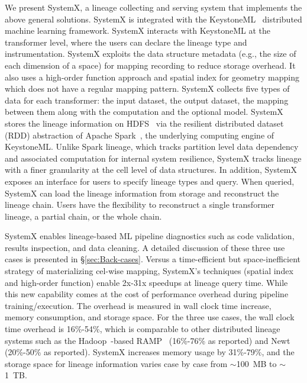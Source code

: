 \documentclass{sig-alternate}
\begin{document}
We present SystemX, a lineage collecting and serving system that implements the above general solutions.
SystemX is integrated with the KeystoneML~\cite{sparks15} distributed machine learning framework.
SystemX interacts with KeystoneML at the transformer level, where the users can declare the lineage type and instrumentation.
SystemX exploits the  data structure metadata (e.g., the size of each dimension of a space) for mapping recording to reduce storage overhead.
It also uses a high-order function approach and spatial index for geometry mapping which does not have a regular mapping pattern.
SystemX collects five types of data for each transformer: the input dataset, the output dataset, the mapping between them
along with the computation and the optional model.
SystemX stores the lineage information on HDFS~\cite{shvachko10} via the resilient distributed dataset (RDD) abstraction
of Apache Spark~\cite{zaharia12}, the underlying computing engine of KeystoneML.
Unlike Spark lineage, which tracks partition level data dependency and associated computation for internal system resilience,
SystemX tracks lineage with a finer granularity at the cell level of data structures.
In addition, SystemX exposes an interface for users to specify lineage types and query.
When queried, SystemX can load the lineage information from storage and reconstruct the lineage chain.
Users have the flexibility to reconstruct a single transformer lineage, a partial chain, or the whole chain.

SystemX enables lineage-based ML pipeline diagnostics such as code validation, results inspection, and data cleaning.
A detailed discussion of these three use cases is presented in \S\ref{sec:Back-cases}.
Versus a time-efficient but space-inefficient strategy of materializing cel-wise mapping, 
SystemX's techniques (spatial index and high-order function) enable 2x-31x speedups at lineage query time.
While this new capability comes at the cost of performance overhead during pipeline training/execution.
The overhead is measured in wall clock time increase, memory consumption, and storage space.
For the three use cases, the wall clock time overhead is 16\%-54\%, which is comparable to other distributed lineage systems
such as the Hadoop~\cite{HADOOP}-based RAMP~\cite{ikeda11, park11} (16\%-76\% as reported)  and Newt~\cite{logothetis13} (20\%-50\% as reported).
SystemX increases memory usage by 31\%-79\%,
and the storage space for lineage information varies case by case from $\sim$100~MB to $\sim$1~TB.
\end{document}
